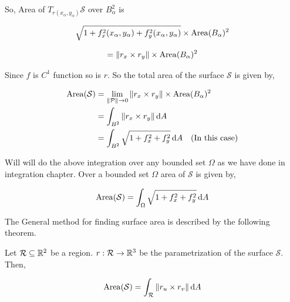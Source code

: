 \documentclass[../Analysis-3.tex]{subfiles}
\begin{document}
So, Area of $T_{r(x_{\alpha},y_{\alpha})} \mathcal{S}$ over $B_{\alpha}^2$ is

$$\sqrt{1 + f_x^2(x_{\alpha},y_{\alpha}) + f_y^2(x_{\alpha},y_{\alpha})} \times \operatorname{Area}(B_{\alpha})^2$$

$$ = \norm{r_x \times r_y} \times \operatorname{Area}(B_{\alpha})^2$$

\pagebreak

Since $f$ is $C^1$ function so is $r$. So the total area of the surface $\mathcal{S}$ is given by,

\begin{align*}
  \operatorname{Area} (\mathcal{S})
   & = \lim_{\norm{\mathcal{P}} \to 0} \norm{r_x \times r_y} \times \operatorname{Area}(B_{\alpha})^2 \\
   & = \int_{B^2} \norm{r_x \times r_y} \, \dd A                                        \\
   & = \int_{B^2} \sqrt{1 + f_x^2 +f_y^2} \, \dd A \quad (\text{In this case})
\end{align*}

Will will do the above integration over any bounded set $\Omega$ as we have done in  integration chapter. Over a bounded set $\Omega$ area of $\mathcal{S}$ is given by,

\begin{equation}
  \operatorname{Area} (\mathcal{S}) =  \int_{\Omega} \sqrt{1 + f_x^2 +f_y^2} \, \dd A \label{eq:surfa}
\end{equation}

The General method for finding surface area is described by the following theorem.

\begin{Thm}{}{}
  Let $\mathcal{R} \subseteq \mathbb{R}^2$ be a region. $r : \mathcal{R} \to \mathbb{R}^3$ be the parametrization of the surface $\mathcal{S}$. Then,

  \[\operatorname{Area}(\mathcal{S}) = \int_{\mathcal{R}} \norm{r_u \times r_v} \, \dd A\]
\end{Thm}
\end{document}
